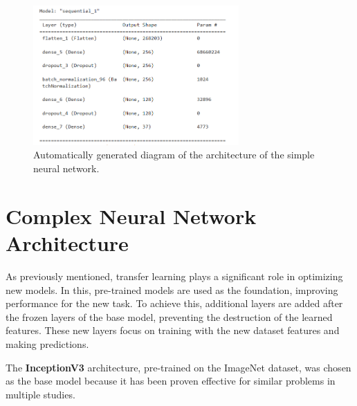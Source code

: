 \begin{figure}[h]
    \centering
    \includegraphics[width=0.7\textwidth]{figures/simple model architecture.png}
    \caption{Automatically generated diagram of the architecture of the simple neural network.}
    \label{fig:architecture_diagram}
\end{figure}

\section{Complex Neural Network Architecture}
As previously mentioned, transfer learning plays a significant role in optimizing new models. In this, pre-trained models are used as the foundation, improving performance for the new task. To achieve this, additional layers are added after the frozen layers of the base model, preventing the destruction of the learned features. These new layers focus on training with the new dataset features and making predictions.

The \textbf{InceptionV3} architecture, pre-trained on the ImageNet dataset, was chosen as the base model because it has been proven effective for similar problems in multiple studies.


